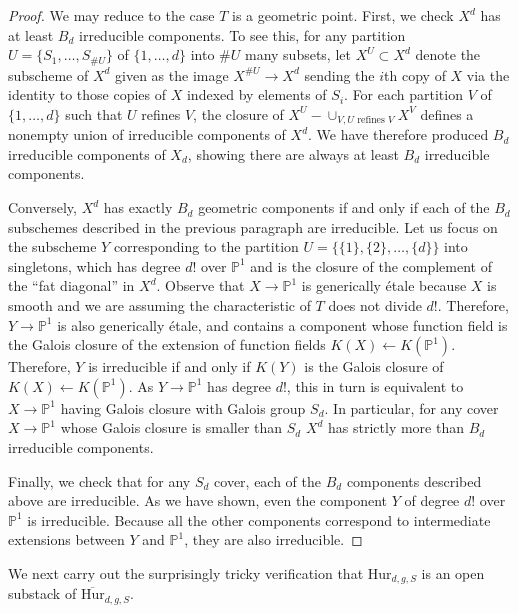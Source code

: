 \documentclass[12 pt]{amsart}
\theoremstyle{plain}
\theoremstyle{definition}
\theoremstyle{remark}
\numberwithin{equation}{section}
\newcommand\bp{\mathbb P}
\newcommand\bighurg[3]{\overline{\mathrm{Hur}}_{#1,#2, #3}} %
\newcommand\hur[3]{\mathrm{Hur}_{#1,#2,#3}} %
\begin{document}
\begin{proof}
	We may reduce to the case $T$ is a geometric point.
	First, we check $X^d$ has at least $B_d$ irreducible components.
	To see this, for any partition $U = \{ S_1, \ldots, S_{\# U}\}$ of $\{1,
	\ldots, d\}$ into $\# U$ many subsets,
	let $X^U \subset X^d$ denote the subscheme of $X^d$ given as the image 
	$X^{\# U} \to X^d$ sending the $i$th copy of $X$ via the identity to
	those copies of $X$ indexed by elements of $S_i$.	
	For each partition $V$ of $\{1, \ldots ,d\}$ such that $U$ refines $V$,
	the closure of $X^U - \cup_{V, U \text{ refines } V} X^V$
	defines a nonempty union of irreducible
components of $X^d$. We have therefore produced $B_d$ irreducible components of
$X_d$, showing there are always at least $B_d$ irreducible components.

Conversely, $X^d$ has exactly $B_d$ geometric components if and only if each of
the $B_d$ subschemes described in the previous paragraph are irreducible.
Let us focus on the subscheme $Y$ corresponding to the partition $U =\{ \{1\},
\{2\}, \ldots, \{d\}\}$ into singletons, which
has degree $d!$ over $\bp^1$ and is the closure of the complement of the ``fat
diagonal'' in $X^d$.
Observe that $X \to \bp^1$ is generically \'etale because $X$ is smooth and we
are assuming the characteristic of $T$ does not divide $d!$.
Therefore, $Y \to \bp^1$ is also generically \'etale, and contains a
component whose function field is the Galois
closure of the extension of function fields $K(X) \leftarrow K(\bp^1)$.
Therefore, $Y$ is irreducible if and only if $K(Y)$ is the Galois
closure of $K(X) \leftarrow K(\bp^1)$. As $Y \to \bp^1$ has degree $d!$, this in turn is equivalent to $X \to \bp^1$
having Galois closure with Galois group $S_d$.
In particular, for any cover $X \to \bp^1$ whose Galois closure is smaller than $S_d$ 
$X^d$
has strictly more than $B_d$ irreducible components.

Finally, we check that for any $S_d$ cover, each of the $B_d$ components described
above are irreducible. As we have shown, even the component $Y$ of degree
$d!$ over $\bp^1$ is irreducible. Because all the other components correspond to
intermediate extensions between $Y$ and $\bp^1$, they are also irreducible.
\end{proof}

We next carry out the surprisingly tricky verification that $\hur d g S$ is an
open substack of $\bighurg d g S$.
\end{document}
